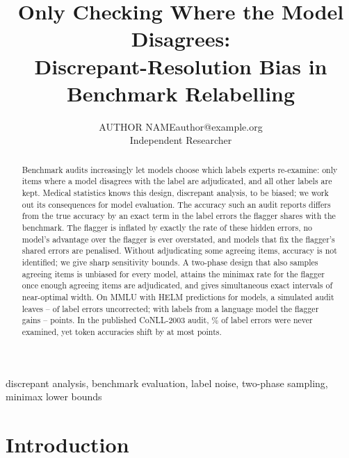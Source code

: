 \documentclass[twoside,11pt]{article}
\makeatletter
\newcommand{\1}{\mathbf{1}}
\newcommand{\AuthorFull}{AUTHOR NAME}
\newcommand{\AuthorEmail}{author@example.org}
\newcommand{\AuthorAddr}{Independent Researcher}
\makeatother
\begin{document}
\title{Only Checking Where the Model Disagrees:\\ Discrepant-Resolution Bias in Benchmark Relabelling}

\author{\name \AuthorFull \email \AuthorEmail \\
       \addr \AuthorAddr}


\maketitle

\begin{abstract}%
Benchmark audits increasingly let models choose which labels experts re-examine: only items where a model disagrees with the label are adjudicated, and all other labels are kept. Medical statistics knows this design, discrepant analysis, to be biased; we work out its consequences for model evaluation. The accuracy such an audit reports differs from the true accuracy by an exact term in the label errors the flagger shares with the benchmark. The flagger is inflated by exactly the rate of these hidden errors, no model's advantage over the flagger is ever overstated, and models that fix the flagger's shared errors are penalised. Without adjudicating some agreeing items, accuracy is not identified; we give sharp sensitivity bounds. A two-phase design that also samples agreeing items is unbiased for every model, attains the minimax rate for the flagger once enough agreeing items are adjudicated, and gives simultaneous exact intervals of near-optimal width. On MMLU with HELM predictions for \nModels{} models, a simulated audit leaves \hiddenTopFiveMinA--\hiddenTopFiveMaxA{} of \nLabelErrA{} label errors uncorrected; with labels from a language model the flagger gains \inflMinB--\inflMaxB{} points. In the published CoNLL-2003 audit, \cnHiddenPct\% of label errors were never examined, yet token accuracies shift by at most \cnHiddenAbsMax{} points.
\end{abstract}

\begin{keywords}
  discrepant analysis, benchmark evaluation, label noise, two-phase sampling, minimax lower bounds
\end{keywords}

\section{Introduction}
\end{document}
